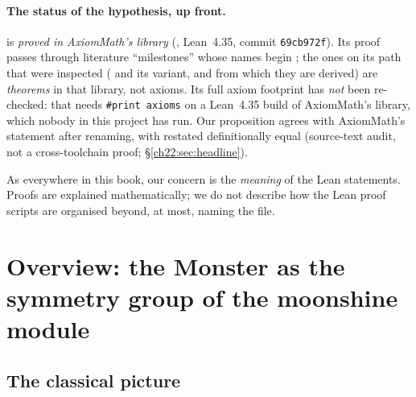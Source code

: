 \paragraph{The status of the hypothesis, up front.}   is \emph{proved in AxiomMath's library}
(, Lean~4.35, commit \texttt{69cb972f}).  Its proof passes
through literature ``milestones'' whose names begin ; the ones on its path that were inspected
( and its  variant, and
 from which they are derived) are \emph{theorems} in
that library, not axioms.  Its full axiom footprint has \emph{not} been re-checked: that needs \texttt{\#print axioms} on a
Lean~4.35 build of AxiomMath's library, which nobody in this project has run.  Our proposition agrees with AxiomMath's
statement after renaming, with  restated definitionally equal (source-text audit, not a cross-toolchain
proof; \S\ref{ch22:sec:headline}).

As everywhere in this book, our concern is the \emph{meaning} of the Lean statements.  Proofs are explained
mathematically; we do not describe how the Lean proof scripts are organised beyond, at most, naming the file.

\section{Overview: the Monster as the symmetry group of the moonshine module}\label{ch22:sec:overview}

\subsection{The classical picture}

